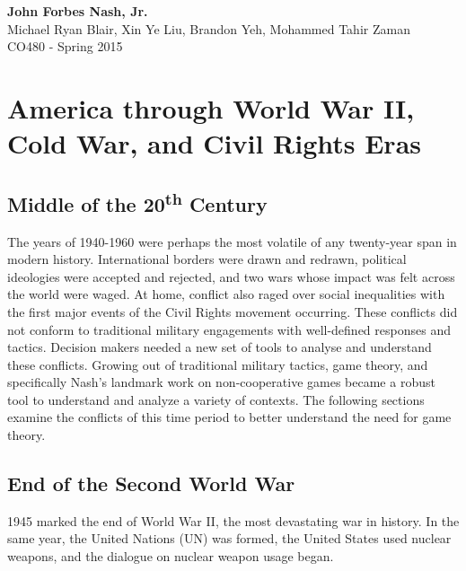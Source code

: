 \documentclass[12pt]{article}
\begin{document}
	\thispagestyle{empty}
	\setcounter{page}{1}
	\begin{center}
		\vspace*{3cm}	
		\textbf{\LARGE John Forbes Nash, Jr.}\\
		\vspace{5pt}
		\large Michael Ryan Blair, Xin Ye Liu, Brandon Yeh, Mohammed Tahir Zaman\\
		\vspace{5pt}
		CO480 - Spring 2015\\
	\end{center}

	\newpage
	
	\tableofcontents
	\newpage
	\singlespacing

\section{America through World War II, Cold War, and Civil Rights Eras}

\subsection{Middle of the 20\textsuperscript{th} Century}

The years of 1940-1960 were perhaps the most volatile of any twenty-year span in modern history. International borders were drawn and redrawn, political ideologies were accepted and rejected, and two wars whose impact was felt across the world were waged. At home, conflict also raged over social inequalities with the first major events of the Civil Rights movement occurring. These conflicts did not conform to traditional military engagements with well-defined responses and tactics. Decision makers needed a new set of tools to analyse and understand these conflicts. Growing out of traditional military tactics, game theory, and specifically Nash's landmark work on non-cooperative games became a robust tool to understand and analyze a variety of contexts. The following sections examine the conflicts of this time period to better understand the need for game theory.

\subsection{End of the Second World War}

1945 marked the end of World War II, the most devastating war in history. In the same year, the United Nations (UN) was formed, the United States used nuclear weapons, and the dialogue on nuclear weapon usage began.
\end{document}
